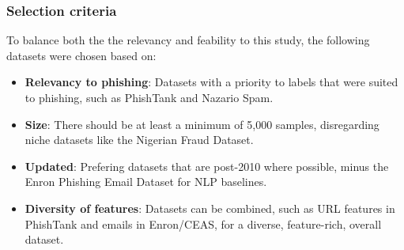 
\subsubsection*{Selection criteria} 
To balance both the the relevancy and feability to this study, the following datasets were chosen based on:

\begin{itemize}
  \item \textbf{Relevancy to phishing}: Datasets with a priority to labels that were suited to phishing, such as PhishTank and Nazario Spam.
  \item \textbf{Size}: There should be at least a minimum of 5,000 samples, disregarding niche datasets like the Nigerian Fraud Dataset.
  \item \textbf{Updated}: Prefering datasets that are post-2010 where possible, minus the Enron Phishing Email Dataset for NLP baselines.
  \item \textbf{Diversity of features}: Datasets can be combined, such as URL features in PhishTank and emails in Enron/CEAS, for a diverse, feature-rich, overall dataset.
\end{itemize}

